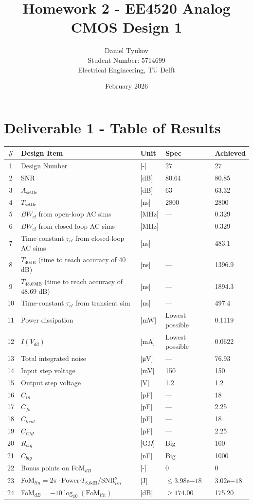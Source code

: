 \documentclass{article}
\title{Homework 2 - EE4520 Analog CMOS Design 1}
\author{Daniel Tyukov \\ Student Number: 5714699 \\ Electrical Engineering, TU Delft}
\date{February 2026}
\begin{document}
\maketitle

\tableofcontents

\clearpage

\section{Deliverable 1 - Table of Results}
\begin{table}[H]
\centering
\small
{}
\begin{tabular}{@{}c l l l l@{}}
\toprule
\# & Design Item & Unit & Spec & Achieved \\
\midrule
1  & Design Number & [-] & 27 & 27 \\
2  & SNR & [dB] & 80.64 & 80.85 \\
3  & $A_{\text{settle}}$ & [dB] & 63 & 63.32 \\
4  & $T_{\text{settle}}$ & [ns] & 2800 & 2800 \\
5  & $BW_{cl}$ from open-loop AC sims & [MHz] & --- & 0.329 \\
6  & $BW_{cl}$ from closed-loop AC sims & [MHz] & --- & 0.329 \\
7  & Time-constant $\tau_{cl}$ from closed-loop AC sims & [ns] & --- & 483.1 \\
8  & $T_{40\text{dB}}$ (time to reach accuracy of 40 dB) & [ns] & --- & 1396.9 \\
9  & $T_{48.69\text{dB}}$ (time to reach accuracy of 48.69 dB) & [ns] & --- & 1894.3 \\
10 & Time-constant $\tau_{cl}$ from transient sim & [ns] & --- & 497.4 \\
11 & Power dissipation & [mW] & Lowest possible & 0.1119 \\
12 & $I(V_{dd})$ & [mA] & Lowest possible & 0.0622 \\
13 & Total integrated noise & [\si{\micro\volt}] & --- & 76.93 \\
14 & Input step voltage & [mV] & 150 & 150 \\
15 & Output step voltage & [V] & 1.2 & 1.2 \\
16 & $C_{in}$ & [pF] & --- & 18 \\
17 & $C_{fb}$ & [pF] & --- & 2.25 \\
18 & $C_{load}$ & [pF] & --- & 18 \\
19 & $C_{CM}$ & [pF] & --- & 2.25 \\
20 & $R_{big}$ & [G$\Omega$] & Big & 100 \\
21 & $C_{big}$ & [nF] & Big & 1000 \\
22 & Bonus points on FoM$_{dB}$ & [-] & 0 & 0 \\
23 & FoM$_{lin}=2\pi\cdot$Power$\cdot T_{8.6\text{dB}}$/SNR$_{lin}^2$ & [J] & $\le 3.98\mathrm{e}{-18}$ & $3.02\mathrm{e}{-18}$ \\
24 & FoM$_{dB}=-10\log_{10}(\mathrm{FoM}_{lin})$ & [dB] & $\ge 174.00$ & 175.20 \\
\bottomrule
\end{tabular}
\end{table}
\end{document}
